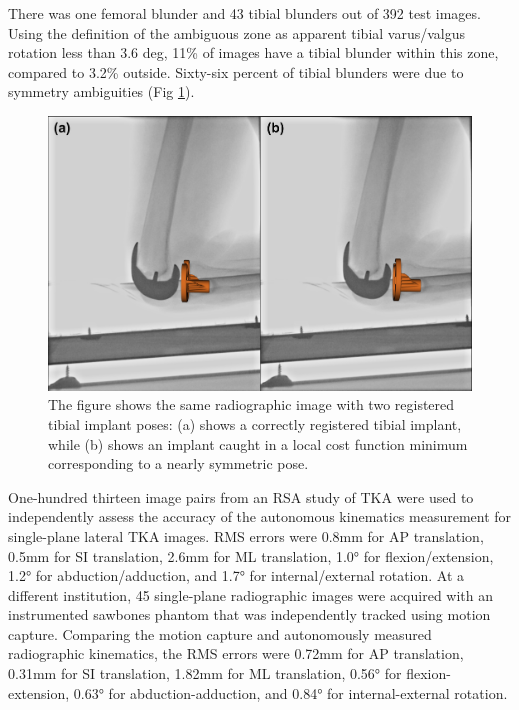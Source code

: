 {There was one femoral blunder and 43 tibial blunders out of 392 test images.
Using the definition of the ambiguous zone as apparent tibial varus/valgus
rotation less than 3.6 deg, 11\% of images have a tibial blunder within this
zone, compared to 3.2\% outside. Sixty-six percent of tibial blunders were due
to symmetry ambiguities (Fig \ref{fig:sym-trap}).


\begin{figure}[!h]
	\centering
	\includegraphics[width = \linewidth]{figs/jtml-paper/fig6-symtrap.png}
	\caption[Two different registered tibial implant poses]{The figure shows the
		same radiographic image with two registered tibial implant poses: (a)
		shows a correctly registered tibial implant, while (b) shows an implant
		caught in a local cost function minimum corresponding to a nearly
		symmetric pose.}
	\label{fig:sym-trap}
\end{figure}

One-hundred thirteen image pairs from an RSA study of TKA were used to independently assess the accuracy of the autonomous kinematics measurement for single-plane lateral TKA images.
RMS errors were 0.8mm for AP translation, 0.5mm for SI translation, 2.6mm for ML translation, 1.0° for flexion/extension, 1.2° for abduction/adduction, and 1.7° for internal/external rotation.
At a different institution, 45 single-plane radiographic images were acquired with an instrumented sawbones phantom that was independently tracked using motion capture.
Comparing the motion capture and autonomously measured radiographic kinematics, the RMS errors were 0.72mm for AP translation, 0.31mm for SI translation, 1.82mm for ML translation, 0.56° for flexion-extension, 0.63° for abduction-adduction, and 0.84° for internal-external rotation.

}
